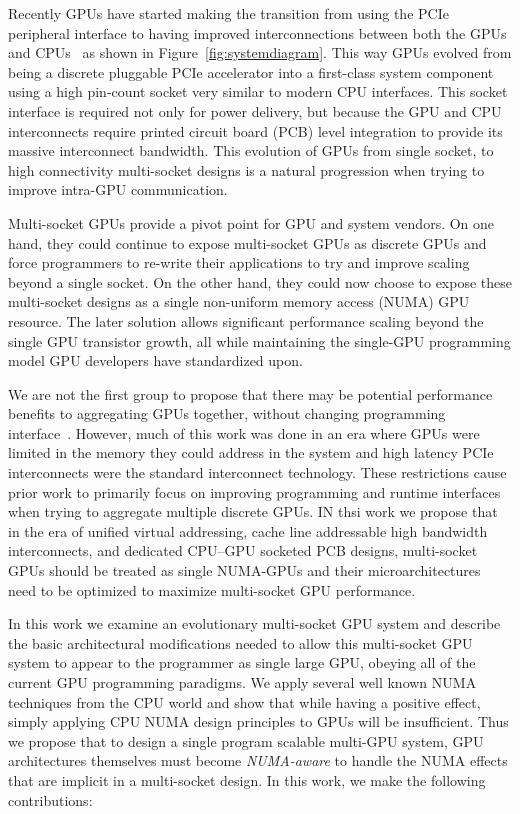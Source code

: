 Recently GPUs have started making the transition from using the PCIe peripheral 
interface to having improved interconnections between both the GPUs and 
CPUs~\cite{dgx,AMDINFINITYFABRIC} as shown in Figure~\ref{fig:systemdiagram}. 
This way GPUs evolved from being a discrete pluggable PCIe accelerator into a
first-class system component using a high pin-count socket very similar to
modern CPU interfaces.
This socket interface is required not only for power delivery, 
but because the GPU and CPU interconnects require printed
circuit board (PCB) level integration to provide its massive interconnect bandwidth.
This evolution of GPUs from single socket, to high connectivity multi-socket designs
is a natural progression when trying to improve intra-GPU communication.

Multi-socket GPUs provide a pivot point for GPU and system vendors. On one hand, they
could continue to expose multi-socket GPUs as discrete GPUs and force programmers
to re-write their applications to try and improve scaling beyond a single socket.
On the other hand, they could now choose to expose these multi-socket designs as
a single non-uniform memory access (NUMA) GPU resource. The later solution allows 
significant performance scaling beyond the single GPU transistor growth, all
while maintaining the single-GPU programming model GPU developers have standardized upon.

We are not the first group to propose that there may be potential performance
benefits to aggregating GPUs together, without changing programming
interface~\cite{Cabezas2015,lee2013transparent}. However, much of this work was
done in an era where GPUs were limited in the memory they could address in the
system and high latency PCIe interconnects were the standard interconnect
technology. These restrictions cause prior work to primarily focus on improving
programming and runtime interfaces when trying to aggregate multiple discrete
GPUs. IN thsi work we propose that in the era of unified virtual addressing,
cache line addressable high bandwidth interconnects, and dedicated CPU--GPU
socketed PCB designs, multi-socket GPUs should be treated as single NUMA-GPUs
and their microarchitectures need to be optimized to maximize multi-socket GPU
performance.

In this work we examine an evolutionary multi-socket GPU system and describe the 
basic architectural modifications needed to allow this multi-socket GPU system to appear to the programmer
as single large GPU, obeying all of the current GPU programming paradigms. We apply 
several well known NUMA techniques from the CPU world and show that
while having a positive effect, simply applying CPU NUMA design principles to GPUs 
will be insufficient. Thus we propose that to design
a single program scalable multi-GPU system, GPU architectures themselves must become
\textit{NUMA-aware} to handle the NUMA effects that are implicit in a multi-socket
design. In this work, we make the following contributions:

